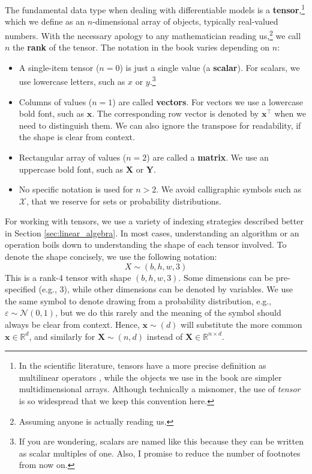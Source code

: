 The fundamental data type when dealing with differentiable models is a \textbf{tensor},\footnote{In the scientific literature, tensors have a more precise definition as multilinear operators \cite{lim2021tensors}, while the objects we use in the book are simpler multidimensional arrays. Although technically a misnomer, the use of \textit{tensor} is so widespread that we keep this convention here.} which we define as an $n$-dimensional array of objects, typically real-valued numbers. With the necessary apology to any mathematician reading us,\footnote{Assuming anyone is actually reading us.} we call $n$ the \textbf{rank} of the tensor. The notation in the book varies depending on $n$:
%
\begin{itemize}
    \item A single-item tensor ($n=0$) is just a single value (a \textbf{scalar}). For scalars, we use lowercase letters, such as $x$ or $y$.\footnote{If you are wondering, scalars are named like this because they can be written as scalar multiples of one. Also, I promise to reduce the number of footnotes from now on.}
    \item Columns of values ($n=1$) are called \textbf{vectors}. For vectors we use a lowercase bold font, such as $\mathbf{x}$. The corresponding row vector is denoted by $\mathbf{x}^\top$ when we need to distinguish them. We can also ignore the transpose for readability, if the shape is clear from context.
    \item Rectangular array of values ($n=2$) are called a \textbf{matrix}. We use an uppercase bold font, such as $\mathbf{X}$ or $\mathbf{Y}$.
    \item No specific notation is used for $n > 2$. We avoid calligraphic symbols such as $\mathcal{X}$, that we reserve for sets or probability distributions.
\end{itemize}
%
For working with tensors, we use a variety of indexing strategies described better in Section \ref{sec:linear_algebra}. In most cases, understanding an algorithm or an operation boils down to understanding the shape of each tensor involved. To denote the shape concisely, we use the following notation:
%
$$
X \sim(b,h,w,3)
$$
%
This is a rank-$4$ tensor with shape $(b,h,w,3)$. Some dimensions can be pre-specified (e.g., $3$), while other dimensions can be denoted by variables. We use the same symbol to denote drawing from a probability distribution, e.g., $\varepsilon \sim \mathcal{N}(0,1)$, but we do this rarely and the meaning of the symbol should always be clear from context. Hence, $\mathbf{x} \sim (d)$ will substitute the more common $\mathbf{x} \in \mathbb{R}^d$, and similarly for $\mathbf{X} \sim (n,d)$ instead of $\mathbf{X} \in \mathbb{R}^{n \times d}$.
